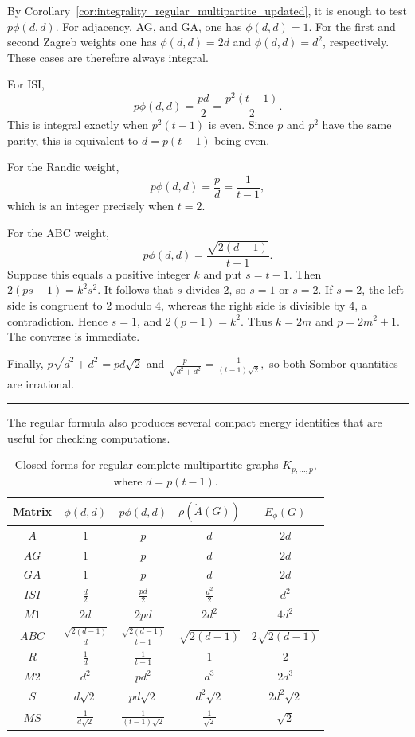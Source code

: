\documentclass[12pt,twoside]{article}
\renewenvironment{proof}{{\noindent\bfseries Proof.}}{\qed}
\def\qed{\nolinebreak\hfill\rule{.2cm}{.2cm}\par\addvspace{.5cm}}
\begin{document}
\begin{proof}
	By Corollary~\ref{cor:integrality_regular_multipartite_updated}, it is enough to test $p\phi(d,d)$.
	 For adjacency, AG, and GA, one has $\phi(d,d)=1$. For the first and second Zagreb weights one has $\phi(d,d)=2d$ and $\phi(d,d)=d^2$, respectively. These cases are therefore always integral.
	
	For ISI,
	$$
	p\phi(d,d)=\frac{pd}{2}=\frac{p^2(t-1)}{2}.
	$$
	This is integral exactly when $p^2(t-1)$ is even. Since $p$ and $p^2$ have the same parity, this is equivalent to $d=p(t-1)$ being even.
	
	For the Randic weight,
	$$
	p\phi(d,d)=\frac{p}{d}=\frac{1}{t-1},
	$$
	which is an integer precisely when $t=2$.
	
	For the ABC weight,
	$$
	p\phi(d,d)=\frac{\sqrt{2(d-1)}}{t-1}.
	$$
	Suppose this equals a positive integer $k$ and put $s=t-1$. Then
	$
	2(ps-1)=k^2s^2.
	$
	It follows that $s$ divides $2$, so $s=1$ or $s=2$. If $s=2$, the left side is congruent to $2$ modulo $4$, whereas the right side is divisible by $4$, a contradiction. Hence $s=1$, and
	$
	2(p-1)=k^2.
	$
	Thus $k=2m$ and $p=2m^2+1$. The converse is immediate.
	
	Finally,
	$
	p\sqrt{d^2+d^2}=pd\sqrt2
	$
	and
	$
	\tfrac{p}{\sqrt{d^2+d^2}}=\tfrac{1}{(t-1)\sqrt2},
	$
	so both Sombor quantities are irrational.
\end{proof}

The regular formula also produces several compact energy identities that are useful for checking computations.

\begin{table}[H]
	\centering
	\caption{Closed forms for regular complete multipartite graphs $K_{p,\ldots,p}$, where $d=p(t-1)$.}
	\label{tab:regular_energy_identities} 
		\begin{tabular}{|c|c|c|c|c|}
			\hline
			Matrix & $\phi(d,d)$ & $p\phi(d,d)$ & $\rho(\dot A(G))$ & $\dot E_\phi(G)$\\
			\hline
			$A$ & $1$ & $p$ & $d$ & $2d$\\
			$AG$ & $1$ & $p$ & $d$ & $2d$\\
			$GA$ & $1$ & $p$ & $d$ & $2d$\\
			$ISI$ & $\tfrac d2$ & $\tfrac{pd}{2}$ & $\tfrac{d^2}{2}$ & $d^2$\\
			$M1$ & $2d$ & $2pd$ & $2d^2$ & $4d^2$\\
			$ABC$ & $\tfrac{\sqrt{2(d-1)}}{d}$ & $\tfrac{\sqrt{2(d-1)}}{t-1}$ & $\sqrt{2(d-1)}$ & $2\sqrt{2(d-1)}$\\
			$R$ & $\tfrac1d$ & $\tfrac1{t-1}$ & $1$ & $2$\\
			$M2$ & $d^2$ & $pd^2$ & $d^3$ & $2d^3$\\
			$S$ & $d\sqrt2$ & $pd\sqrt2$ & $d^2\sqrt2$ & $2d^2\sqrt2$\\
			$MS$ & $\tfrac1{d\sqrt2}$ & $\tfrac1{(t-1)\sqrt2}$ & $\tfrac1{\sqrt2}$ & $\sqrt2$\\
			\hline
	\end{tabular}
\end{table}
\end{document}

